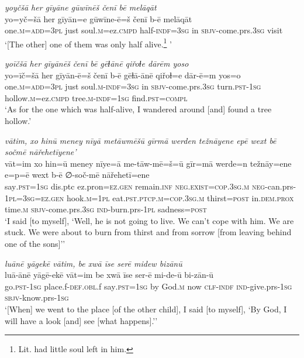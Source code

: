\ea \label{ZQ.19}
\textit{yoyčšā her gīyāne gūwīnēš čenī bē melāqāt} \\ 
\gll yo=yč=šā her gīyān=e gūwīne-ē=š čenī b-ē melāqāt \\ 
 one\textsc{.m}\textsc{=add}\textsc{=3pl} just soul\textsc{.m}=ez\textsc{.cmpd} half\textsc{-indf}\textsc{=3sg} in \textsc{sbjv-}come.prs\textsc{.3sg} visit \\ 
\glt `[The other] one of them was only half alive.\footnote{Lit. had little soul left in him.}    '
\z 
 
\ea \label{ZQ.23}
\textit{yoīčšā her gīyānēš čenī bē gēɫānē qiřoɫe dārēm yoso} \\ 
\gll yo=īč=šā her gīyān-ē=š čenī b-ē gēɫā-ānē qiřoɫ=e dār-ē=m yos=o \\ 
 one\textsc{.m}\textsc{=add}\textsc{=3pl} just soul\textsc{.m}\textsc{-indf}\textsc{=3sg} in \textsc{sbjv-}come.prs\textsc{.3sg} turn\textsc{.pst}\textsc{-\textsc{1sg}} hollow\textsc{.m}=ez\textsc{.cmpd} tree\textsc{.m}\textsc{-indf}\textsc{=\textsc{1sg}} find\textsc{.pst}\textsc{=compl} \\ 
\glt `As for the one which was half-alive, I wandered around [and] found a tree hollow.'
\z 
 
\ea \label{ZQ.25}
\textit{vātim, xo hinū meney nīyā metāwmēšū gīrmā werden težnāyene epē wext bē sočmē nāřehetīyene’} \\ 
\gll vāt=im xo hin=ū meney nīye=ā me-tāw-mē=š=ū gīr=mā werde=n težnāy=ene e=p=ē wext b-ē ∅-soč-mē nāřehetī=ene \\ 
 say\textsc{.pst}\textsc{=\textsc{1sg}} dis.ptc ez.pron\textsc{=ez.gen} remain\textsc{.inf} \textsc{\textsc{neg.}exist}\textsc{=cop}\textsc{.3sg}\textsc{.m} \textsc{neg-}can.prs\textsc{-\textsc{1pl}}\textsc{=3sg}\textsc{=ez.gen} hook\textsc{.m}\textsc{=\textsc{1pl}} eat\textsc{.pst}\textsc{.ptcp}\textsc{.m}\textsc{=cop}\textsc{.3sg}\textsc{.m} thirst\textsc{=\textsc{post}} in.\textsc{dem.prox} time\textsc{.m} \textsc{sbjv-}come.prs\textsc{.3sg} \textsc{ind-}burn.prs\textsc{-\textsc{1pl}} sadness\textsc{=\textsc{post}} \\ 
\glt `I said [to myself], ‘Well, he is not going to live. We can’t cope with him. We are stuck. We were about to burn from thirst and from sorrow [from leaving behind one of the sons]’'
\z 
 
\ea \label{ZQ.35}
\textit{luānē yāgekē vātim, be xwā īse serē midew bizānū} \\ 
\gll luā-ānē yāgē-ekē vāt=im be xwā īse ser-ē mi-de-ū bi-zān-ū \\ 
 go\textsc{.pst}\textsc{-\textsc{1sg}} place.f\textsc{-def}\textsc{.obl}.f say\textsc{.pst}\textsc{=\textsc{1sg}} by God\textsc{.m} now \textsc{clf}\textsc{-indf} \textsc{ind-}give.prs\textsc{-\textsc{1sg}} \textsc{sbjv-}know.prs\textsc{-\textsc{1sg}} \\ 
\glt `[When] we went to the place [of the other child], I said [to myself], ‘By God, I will have a look [and] see [what happens].’'
\z 
 
